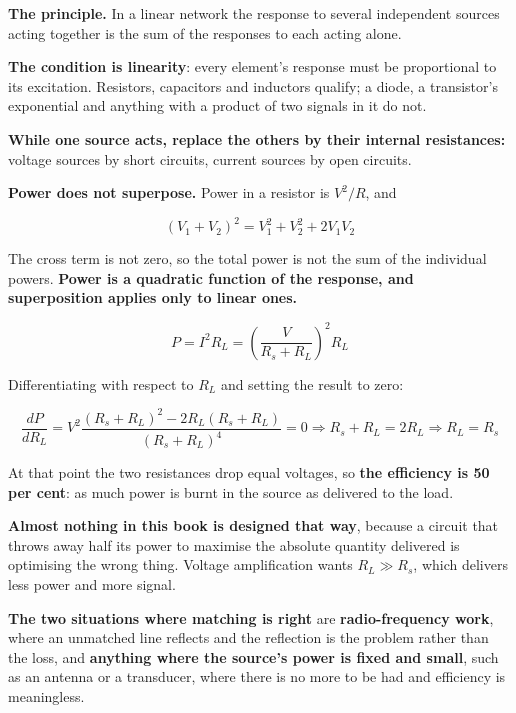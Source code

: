\textbf{The principle.} In a linear network the response to several independent sources acting together is the sum of the responses to each acting alone.

\textbf{The condition is linearity}: every element's response must be proportional to its excitation. Resistors, capacitors and inductors qualify; a diode, a transistor's exponential and anything with a product of two signals in it do not.

\textbf{While one source acts, replace the others by their internal resistances:} voltage sources by short circuits, current sources by open circuits.

\textbf{Power does not superpose.} Power in a resistor is $V^2/R$, and

\[
  (V_1 + V_2)^2 = V_1^2 + V_2^2 + 2V_1V_2
\]

The cross term is not zero, so the total power is not the sum of the individual powers. \textbf{Power is a quadratic function of the response, and superposition applies only to linear ones.}


\[
  P = I^2 R_L = \left(\frac{V}{R_s + R_L}\right)^2 R_L
\]

Differentiating with respect to $R_L$ and setting the result to zero:

\[
  \frac{dP}{dR_L} = V^2\frac{(R_s + R_L)^2 - 2R_L(R_s + R_L)}{(R_s + R_L)^4} = 0
  \Rightarrow R_s + R_L = 2R_L \Rightarrow \boxed{R_L = R_s}
\]

At that point the two resistances drop equal voltages, so \textbf{the efficiency is 50 per cent}: as much power is burnt in the source as delivered to the load.

\textbf{Almost nothing in this book is designed that way}, because a circuit that throws away half its power to maximise the absolute quantity delivered is optimising the wrong thing. Voltage amplification wants $R_L \gg R_s$, which delivers less power and more signal.

\textbf{The two situations where matching is right} are \textbf{radio-frequency work}, where an unmatched line reflects and the reflection is the problem rather than the loss, and \textbf{anything where the source's power is fixed and small}, such as an antenna or a transducer, where there is no more to be had and efficiency is meaningless.


